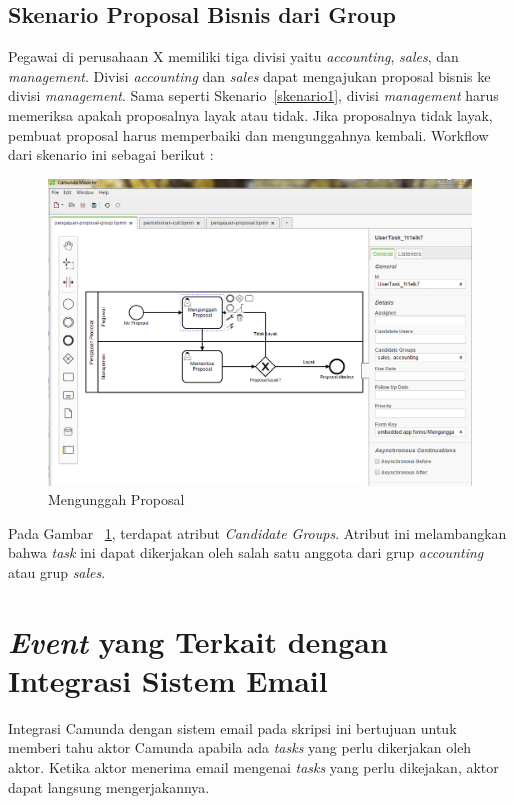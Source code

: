 \subsection{Skenario Proposal Bisnis dari Group}
\label{skenario2}
Pegawai di perusahaan X memiliki tiga divisi yaitu \textit{accounting}, \textit{sales}, dan \textit{management}. Divisi \textit{accounting} dan \textit{sales} dapat mengajukan proposal bisnis ke divisi \textit{management}. Sama seperti Skenario~\ref{skenario1}, divisi \textit{management} harus memeriksa apakah proposalnya layak atau tidak. Jika proposalnya tidak layak, pembuat proposal harus memperbaiki dan mengunggahnya kembali. Workflow dari skenario ini sebagai berikut :

		\begin{figure}[H]
			\centering
			\includegraphics[scale=0.5]{Gambar/Bab-3/Kasus2-1}
			\caption{Mengunggah Proposal} 
			\label{fig:mengunggahproposalgroup}
		\end{figure}
Pada Gambar ~\ref{fig:mengunggahproposalgroup}, terdapat atribut \textit{Candidate Groups}. Atribut ini melambangkan bahwa \textit{task} ini dapat dikerjakan oleh salah satu anggota dari grup \textit{accounting} atau grup \textit{sales}.


\section{\textit{Event} yang Terkait dengan Integrasi Sistem Email}
\label{sec:eventUserTask}

Integrasi Camunda dengan sistem email pada skripsi ini bertujuan untuk memberi tahu aktor Camunda apabila ada \textit{tasks} yang perlu dikerjakan oleh aktor. Ketika aktor menerima email mengenai \textit{tasks} yang perlu dikejakan, aktor dapat langsung mengerjakannya. 

